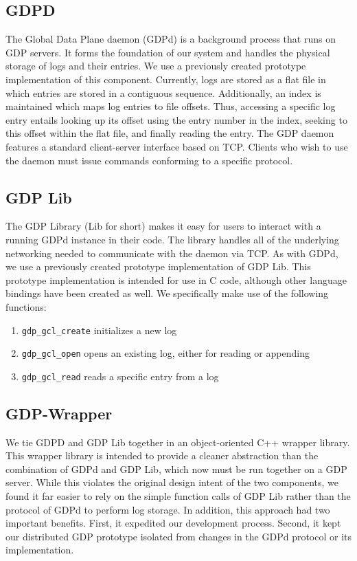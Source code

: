 \subsection{GDPD}
The Global Data Plane daemon (GDPd) is a background process that runs on GDP servers. It forms the foundation of our system and handles the physical storage of logs and their entries. We use a previously created prototype implementation of this component. Currently, logs are stored as a flat file in which entries are stored in a contiguous sequence. Additionally, an index is maintained which maps log entries to file offsets. Thus, accessing a specific log entry entails looking up its offset using the entry number in the index, seeking to this offset within the flat file, and finally reading the entry. The GDP daemon features a standard client-server interface based on TCP. Clients who wish to use the daemon must issue commands conforming to a specific protocol.

\subsection{GDP Lib}
The GDP Library (Lib for short) makes it easy for users to interact with a running GDPd instance in their code. The library handles all of the underlying networking needed to communicate with the daemon via TCP. As with GDPd, we use a previously created prototype implementation of GDP Lib. This prototype implementation is intended for use in C code, although other language bindings have been created as well. We specifically make use of the following functions:
\begin{enumerate}
\item \texttt{gdp\_gcl\_create} initializes a new log
\item \texttt{gdp\_gcl\_open} opens an existing log, either for reading or appending
\item \texttt{gdp\_gcl\_read} reads a specific entry from a log
\end{enumerate}

\subsection{GDP-Wrapper}
We tie GDPD and GDP Lib together in an object-oriented C++ wrapper library. This wrapper library is intended to provide a cleaner abstraction than the combination of GDPd and GDP Lib, which now must be run together on a GDP server. While this violates the original design intent of the two components, we found it far easier to rely on the simple function calls of GDP Lib rather than the protocol of GDPd to perform log storage. In addition, this approach had two important benefits. First, it expedited our development process. Second, it kept our distributed GDP prototype isolated from changes in the GDPd protocol or its implementation.

